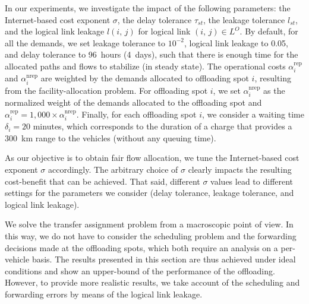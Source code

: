 In our experiments, we investigate the impact of the following parameters: the Internet-based cost exponent $\sigma$, the delay tolerance $\tau_{st}$, the leakage tolerance $l_{st}$, and the logical link leakage $l(i,\,j)$ for logical link $(i,\,j)\in L^{O}$. By default, for all the demands, we set leakage tolerance to $10^{-2}$, logical link leakage to 0.05, and delay tolerance to 96~hours (4~days), such that there is enough time for the allocated paths and flows to stabilize (\ie in steady state). The operational costs $\alpha^{\text{rep}}_{i}$ and $\alpha^{\text{nrep}}_{i}$ are weighted by the demands allocated to offloading spot $i$, resulting from the facility-allocation problem. For offloading spot $i$, we set $\alpha^{\text{nrep}}_{i}$ as the normalized weight of the demands allocated to the offloading spot and  $\alpha^{\text{rep}}_{i} = 1,000 \times\alpha^{\text{nrep}}_{i}$. Finally, for each offloading spot $i$, we consider a waiting time $\delta_{i} = 20$ minutes, which corresponds to the duration of a charge that provides a 300~km range to the vehicles (without any queuing time).

As our objective is to obtain fair flow allocation, we tune the Internet-based cost exponent $\sigma$ accordingly. The arbitrary choice of $\sigma$ clearly impacts the resulting cost-benefit that can be achieved. That said, different $\sigma$ values lead to different settings for the parameters we consider (delay tolerance, leakage tolerance, and logical link leakage).

We solve the transfer assignment problem from a macroscopic point of view. In this way, we do not have to consider the scheduling problem and the forwarding decisions made at the offloading spots, which both require an analysis on a per-vehicle basis. The results presented in this section are thus achieved under ideal conditions and show an upper-bound of the performance of the offloading. However, to provide more realistic results, we take account of the scheduling and forwarding errors by means of the logical link leakage.


